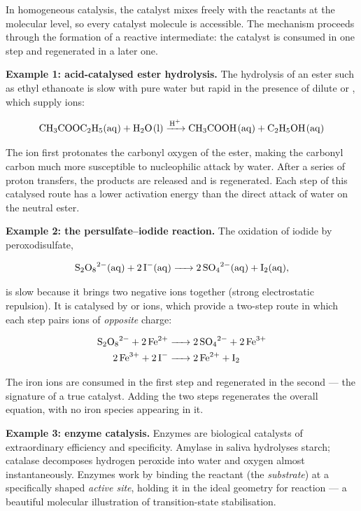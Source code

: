 \documentclass[11pt]{article}
\newcommand{\cle}[1]{{\popxbold\color{popdark}#1}}
\newcounter{popsec}
\newcounter{popsub}
\newcommand{\courssub}[1]{%
  \stepcounter{popsub}%
  \par\vspace{9pt}\noindent{\popxbold\fontsize{11.5}{13}\selectfont\color{popink}{\color{poporange}\thepopsec.\thepopsub}\hspace{6pt}#1}\par\nopagebreak\vspace{4pt}
}
\begin{document}
\courssub{Homogeneous Catalysis}

In homogeneous catalysis, the catalyst mixes freely with the reactants at the molecular level, so every catalyst molecule is accessible. The mechanism proceeds through the formation of a reactive \cle{intermediate}: the catalyst is consumed in one step and regenerated in a later one.

\textbf{Example 1: acid-catalysed ester hydrolysis.} The hydrolysis of an ester such as ethyl ethanoate is slow with pure water but rapid in the presence of dilute  or , which supply  ions:

\[
\ce{CH3COOC2H5(aq) + H2O(l) ->[H+] CH3COOH(aq) + C2H5OH(aq)}
\]

The  ion first protonates the carbonyl oxygen of the ester, making the carbonyl carbon much more susceptible to nucleophilic attack by water. After a series of proton transfers, the products are released and  is regenerated. Each step of this catalysed route has a lower activation energy than the direct attack of water on the neutral ester.

\textbf{Example 2: the persulfate--iodide reaction.} The oxidation of iodide by peroxodisulfate,

\[
\ce{S2O8^{2-}(aq) + 2I^{-}(aq) -> 2SO4^{2-}(aq) + I2(aq)},
\]

is slow because it brings two negative ions together (strong electrostatic repulsion). It is catalysed by  or  ions, which provide a two-step route in which each step pairs ions of \emph{opposite} charge:

\begin{align*}
\ce{S2O8^{2-} + 2Fe^{2+} &-> 2SO4^{2-} + 2Fe^{3+}}\\
\ce{2Fe^{3+} + 2I^{-} &-> 2Fe^{2+} + I2}
\end{align*}

The iron ions are consumed in the first step and regenerated in the second — the signature of a true catalyst. Adding the two steps regenerates the overall equation, with no iron species appearing in it.

\textbf{Example 3: enzyme catalysis.} Enzymes are biological catalysts of extraordinary efficiency and specificity. Amylase in saliva hydrolyses starch; catalase decomposes hydrogen peroxide into water and oxygen almost instantaneously. Enzymes work by binding the reactant (the \emph{substrate}) at a specifically shaped \emph{active site}, holding it in the ideal geometry for reaction — a beautiful molecular illustration of transition-state stabilisation.
\end{document}
